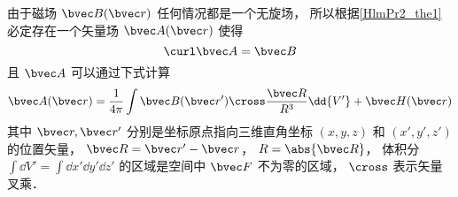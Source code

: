 
\begin{issues}
\issueDraft
\end{issues}


由于磁场 $\bvec B(\bvec r)$ 任何情况都是一个无旋场， 所以根据\autoref{HlmPr2_the1}~ 必定存在一个矢量场 $\bvec A(\bvec r)$ 使得
\begin{equation}
\curl \bvec A = \bvec B
\end{equation}
且 $\bvec A$ 可以通过下式计算
\begin{equation}
\bvec A(\bvec r) = \frac{1}{4\pi} \int \bvec B(\bvec r') \cross \frac{\bvec R}{R^3} \dd{V'} + \bvec H(\bvec r)
\end{equation}
其中 $\bvec r, \bvec r'$ 分别是坐标原点指向三维直角坐标 $(x, y, z)$ 和 $(x', y', z')$ 的位置矢量， $\bvec R = \bvec r' - \bvec r$， $R = \abs{\bvec R}$， 体积分 $\int\dd{V'} = \int\dd{x'}\dd{y'}\dd{z'}$ 的区域是空间中 $\bvec F$ 不为零的区域， $\cross$ 表示矢量叉乘．
